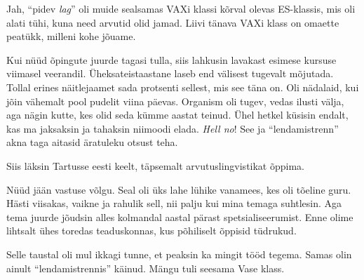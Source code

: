
Jah, \enquote{pidev \emph{lag}} oli muide sealsamas VAXi klassi kõrval olevas 
ES-klassis, mis oli alati tühi, kuna need arvutid olid jamad. Liivi tänava 
VAXi klass on omaette peatükk, milleni kohe jõuame.\label{sisu:jaanus:vask}

Kui nüüd õpingute juurde tagasi tulla, siis lahkusin lavakast esi{\-}mese kursuse viimasel veerandil. Üheksateistaastane laseb end
välisest tugevalt mõjutada. Tollal erines
näitlejaamet sada protsenti sellest, mis see täna on. 
Oli nädalaid, kui jõin vähemalt pool pudelit viina päevas. 
Organism oli tugev, vedas ilusti välja, aga nägin kutte, kes olid 
seda kümme aastat teinud. Ühel hetkel küsisin endalt, kas ma jaksaksin 
ja tahaksin niimoodi elada. \emph{Hell no}! See ja \enquote{lendamistrenn} akna taga aitasid äratuleku otsust teha. 

Siis läksin Tartusse eesti keelt, täpsemalt 
arvutuslingvistikat õppima.


Nüüd jään vastuse võlgu. Seal oli üks lahe lühike vanamees, kes 
oli tõeline guru. Hästi viisakas, vaikne ja rahulik sell, nii palju kui 
mina temaga suhtlesin. Aga tema juurde jõudsin alles kolmandal aastal pärast 
spetsialiseerumist. Enne olime lihtsalt ühes toredas teaduskonnas, kus 
põhiliselt õppisid tüdrukud.

Selle taustal oli mul ikkagi tunne, et peaksin ka mingit tööd tegema. Samas olin
ainult \enquote{lendamistrennis} käinud. Mängu tuli seesama Vase klass.

